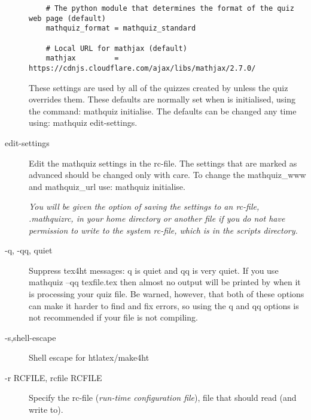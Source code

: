 \documentclass[svgnames]{article}
\newcommand\ddash{\texttt{\textemdash\textemdash}}
\newcommand\mathquizopt[1]{\textsf{mathquiz \ddash#1}}
\begin{document}
\begin{description}
\begin{verbatim}
    # The python module that determines the format of the quiz web page (default)
    mathquiz_format = mathquiz_standard

    # Local URL for mathjax (default)
    mathjax         = https://cdnjs.cloudflare.com/ajax/libs/mathjax/2.7.0/
          \end{verbatim}

          These settings are used by all of the quizzes created by
          \MathQuiz unless the quiz overrides them. These defaults are
          normally set when \MathQuiz is initialised, using the command:
          \mathquizopt{initialise}. The defaults can be changed any time using:
          \mathquizopt{edit-settings}.

       \item[\ddash edit-settings] 
          Edit the mathquiz settings in the rc-file. The settings that
          are marked as advanced should be changed only with care. To
          change the \textsf{mathquiz\_www} and \textsf{mathquiz\_url}
          use: \mathquizopt{initialise}.

          \textit{You will be given the option of saving the \MathQuiz settings to an rc-file,
          \textsf{.mathquizrc}, in your home directory or another file if you do
          not have permission to write to the system rc-file, which is in the
          \MathQuiz scripts directory. }

       \item[-q, -qq, \ddash quiet] 
       Suppress tex4ht messages: \textsf{\ddash q} is quiet and \textsf{\ddash qq} is  very quiet. If you use
       \textsf{mathquiz --qq texfile.tex} then almost no output will
       be printed by \MathQuiz when it is processing your quiz file. Be
       warned, however, that both of these options can make it harder to find and fix
       errors, so using the \textsf{\ddash q} and \textsf{\ddash qq} options is not
       recommended if your file is not compiling.

       \item[-s,\ddash shell-escape] 
          Shell escape for htlatex/make4ht

       \item[-r RCFILE, \ddash rcfile RCFILE]
          Specify the rc-file (\textit{run-time configuration file}), file
          that \MathQuiz should read (and write to).


\end{description}
\end{document}
